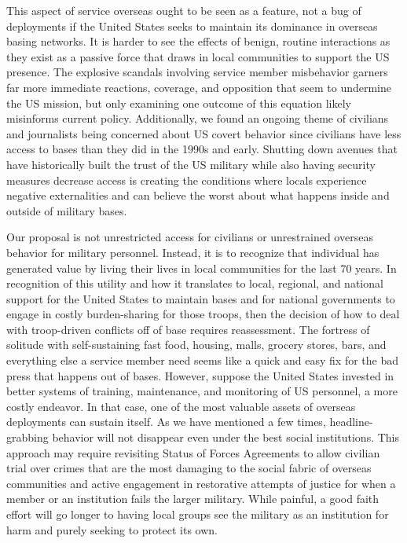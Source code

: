 This aspect of service overseas ought to be seen as a feature, not a bug of deployments if the United States seeks to maintain its dominance in overseas basing networks. It is harder to see the effects of benign, routine interactions as they exist as a passive force that draws in local communities to support the US presence. The explosive scandals involving service member misbehavior garners far more immediate reactions, coverage, and opposition that seem to undermine the US mission, but only examining one outcome of this equation likely misinforms current policy. Additionally, we found an ongoing theme of civilians and journalists being concerned about US covert behavior since civilians have less access to bases than they did in the 1990s and early. Shutting down avenues that have historically built the trust of the US military while also having security measures decrease access is creating the conditions where locals experience negative externalities and can believe the worst about what happens inside and outside of military bases.

Our proposal is not unrestricted access for civilians or unrestrained overseas behavior for military personnel. Instead, it is to recognize that individual has generated value by living their lives in local communities for the last 70 years. In recognition of this utility and how it translates to local, regional, and national support for the United States to maintain bases and for national governments to engage in costly burden-sharing for those troops, then the decision of how to deal with troop-driven conflicts off of base requires reassessment. The fortress of solitude with self-sustaining fast food, housing, malls, grocery stores, bars, and everything else a service member need seems like a quick and easy fix for the bad press that happens out of bases. However, suppose the United States invested in better systems of training, maintenance, and monitoring of US personnel, a more costly endeavor. In that case, one of the most valuable assets of overseas deployments can sustain itself. As we have mentioned a few times, headline-grabbing behavior will not disappear even under the best social institutions. This approach may require revisiting Status of Forces Agreements to allow civilian trial over crimes that are the most damaging to the social fabric of overseas communities and active engagement in restorative attempts of justice for when a member or an institution fails the larger military. While painful, a good faith effort will go longer to having local groups see the military as an institution for harm and purely seeking to protect its own.

